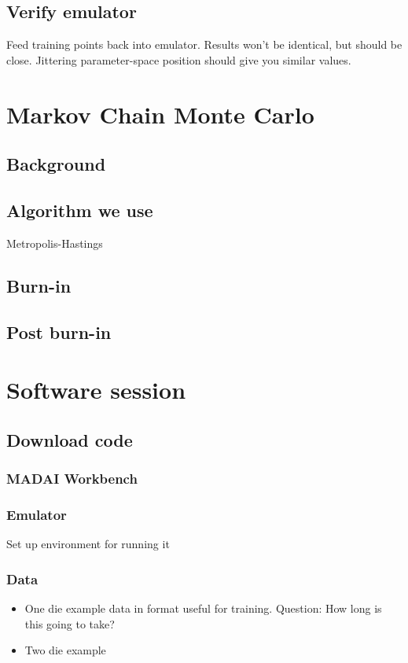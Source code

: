 \documentclass{article}
\begin{document}
\subsection{Verify emulator}

Feed training points back into emulator. Results won't be identical, but should be close. Jittering parameter-space position should give you similar values.

\section{Markov Chain Monte Carlo}

\subsection{Background}

\subsection{Algorithm we use}

Metropolis-Hastings

\subsection{Burn-in}

\subsection{Post burn-in}



\section{Software session}

\subsection{Download code}

\subsubsection{MADAI Workbench}

\subsubsection{Emulator}

Set up environment for running it

\subsubsection{Data}

\begin{itemize}

\item One die example data in format useful for training. Question: How long is this going to take?

\item Two die example

\end{itemize}
\end{document}
